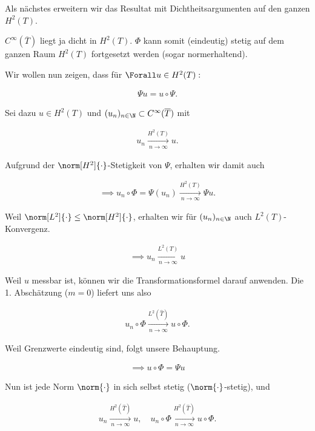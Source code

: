 \begin{solution}
Als nächstes erweitern wir das Resultat mit Dichtheitsargumenten auf den ganzen $H^2(T)$.

$C^{\infty}(\overline{T})$ liegt ja dicht in $H^2(T)$.
$\Phi$ kann somit (eindeutig) stetig auf dem ganzen Raum $H^2(T)$ fortgesetzt werden
(sogar normerhaltend).

Wir wollen nun zeigen, dass für $\Forall u \in H^2(T):$

\begin{align*}
  \Psi u = u \circ \Psi.
\end{align*}

Sei dazu $u \in H^2(T)$ und $(u_n)_{n \in \N} \subset C^{\infty}(\overline{T})$ mit

\begin{align*}
  u_n \xrightarrow[n \to \infty]{H^2(T)} u.
\end{align*}

Aufgrund der $\norm[H^2]{\cdot}$-Stetigkeit von $\Psi$, erhalten wir damit auch

\begin{align*}
  \implies
  u_n \circ \Phi = \Psi(u_n) \xrightarrow[n \to \infty]{H^2(T)} \Psi u.
\end{align*}

Weil $\norm[L^2]{\cdot} \leq \norm[H^2]{\cdot}$, erhalten wir für $(u_n)_{n \in \N}$ auch $L^2(T)$-Konvergenz.

\begin{align*}
  \implies
  u_n \xrightarrow[n \to \infty]{L^2(T)} u
\end{align*}

Weil $u$ messbar ist, können wir die Transformationsformel darauf anwenden.
Die 1. Abschätzung ($m = 0$) liefert uns also

\begin{align*}
  u_n \circ \Phi \xrightarrow[n \to \infty]{L^2(\hat T)} u \circ \Phi.
\end{align*}

Weil Grenzwerte eindeutig sind, folgt unsere Behauptung.

\begin{align*}
  \implies
  u \circ \Phi = \Psi u
\end{align*}

Nun ist jede Norm $\norm{\cdot}$ in sich selbst stetig ($\norm{\cdot}$-stetig), und

\begin{align*}
  u_n \xrightarrow[n \to \infty]{H^2(\hat T)} u,
  \quad
  u_n \circ \Phi \xrightarrow[n \to \infty]{H^2(\hat T)} u \circ \Phi.
\end{align*}


\end{solution}
